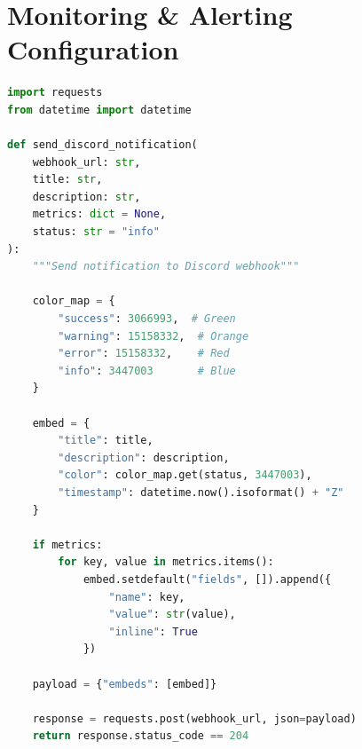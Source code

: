 \section{Monitoring \& Alerting Configuration}

\begin{lstlisting}[language=python, caption={Discord Notification Function}]
import requests
from datetime import datetime

def send_discord_notification(
    webhook_url: str,
    title: str,
    description: str,
    metrics: dict = None,
    status: str = "info"
):
    """Send notification to Discord webhook"""
    
    color_map = {
        "success": 3066993,  # Green
        "warning": 15158332,  # Orange
        "error": 15158332,    # Red
        "info": 3447003       # Blue
    }
    
    embed = {
        "title": title,
        "description": description,
        "color": color_map.get(status, 3447003),
        "timestamp": datetime.now().isoformat() + "Z"
    }
    
    if metrics:
        for key, value in metrics.items():
            embed.setdefault("fields", []).append({
                "name": key,
                "value": str(value),
                "inline": True
            })
    
    payload = {"embeds": [embed]}
    
    response = requests.post(webhook_url, json=payload)
    return response.status_code == 204
\end{lstlisting}

